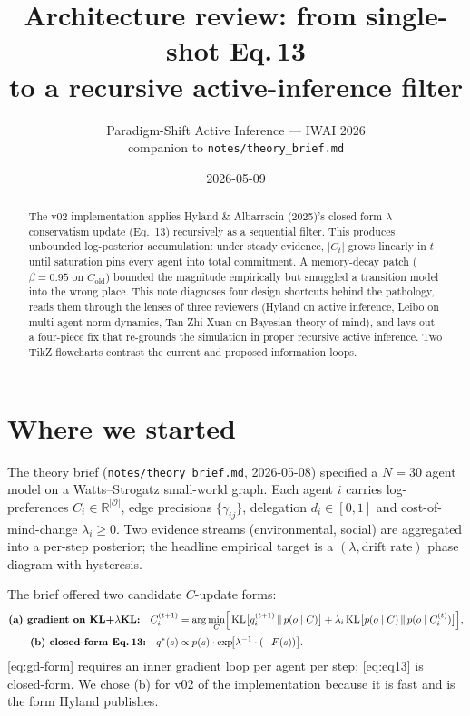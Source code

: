 \documentclass[11pt,a4paper]{article}
\title{Architecture review: from single-shot Eq.\,13 \\
       to a recursive active-inference filter}
\author{Paradigm-Shift Active Inference --- IWAI 2026 \\
        \small companion to \texttt{notes/theory\_brief.md}}
\date{2026-05-09}
\newcommand{\code}[1]{\texttt{\small #1}}
\begin{document}
\maketitle

\begin{abstract}
\noindent The v02 implementation applies Hyland \& Albarracin (2025)'s
closed-form $\lambda$-conservatism update (Eq.~13) recursively as a sequential
filter. This produces unbounded log-posterior accumulation: under steady
evidence, $|C_t|$ grows linearly in $t$ until saturation pins every agent into
total commitment. A memory-decay patch ($\beta = 0.95$ on $C_{\text{old}}$)
bounded the magnitude empirically but smuggled a transition model into the
wrong place. This note diagnoses four design shortcuts behind the pathology,
reads them through the lenses of three reviewers (Hyland on active inference,
Leibo on multi-agent norm dynamics, Tan Zhi-Xuan on Bayesian theory of mind),
and lays out a four-piece fix that re-grounds the simulation in proper
recursive active inference. Two TikZ flowcharts contrast the current and
proposed information loops.
\end{abstract}

\section{Where we started}
\label{sec:plan}

The theory brief (\code{notes/theory\_brief.md}, 2026-05-08) specified a
$N=30$ agent model on a Watts--Strogatz small-world graph. Each agent
$i$ carries log-preferences $C_i \in \mathbb{R}^{|\mathcal{O}|}$, edge
precisions $\{\gamma_{ij}\}$, delegation $d_i \in [0,1]$ and
cost-of-mind-change $\lambda_i \geq 0$. Two evidence streams (environmental,
social) are aggregated into a per-step posterior; the headline empirical
target is a $(\lambda, \text{drift rate})$ phase diagram with hysteresis.

The brief offered two candidate $C$-update forms:
\begin{align}
\textbf{(a) gradient on KL+}\lambda\textbf{KL:} \quad
   C_i^{(t+1)} &= \arg\min_C \Bigl[\,
      \mathrm{KL}\bigl[q_i^{(t+1)} \,\|\, p(o\mid C)\bigr]
      + \lambda_i \,\mathrm{KL}\bigl[p(o\mid C) \,\|\, p(o\mid C_i^{(t)})\bigr]
   \Bigr], \label{eq:gd-form}\\[2pt]
\textbf{(b) closed-form Eq.\,13:} \quad
   q^*(s) &\propto p(s) \cdot \exp\!\bigl[\lambda^{-1} \cdot (-F(s))\bigr]. \label{eq:eq13}
\end{align}
\eqref{eq:gd-form} requires an inner gradient loop per agent per step;
\eqref{eq:eq13} is closed-form. We chose (b) for v02 of the implementation
because it is fast and is the form Hyland publishes.
\end{document}
